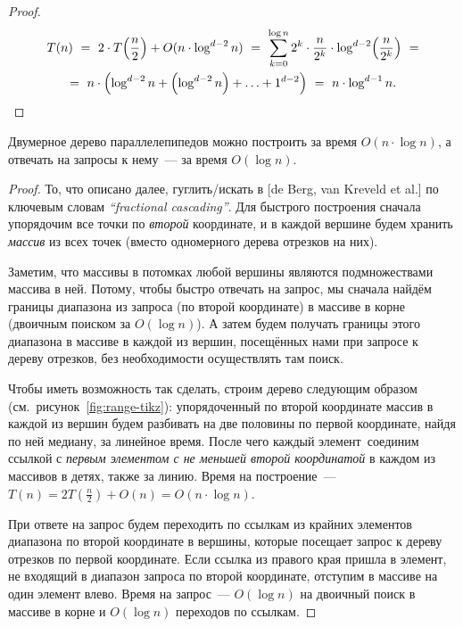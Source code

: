 \documentclass[a4paper,11pt]{article}
\begin{document}
\begin{proof}  \begin{multline*}
  T(n)\ =\ 2 \cdot T \lr*{\frac n 2} + O (n \cdot \log^{d-2} n)\ =\ 
  \sum_{k = 0}^{\log n} 2^k \cdot \frac{n}{2^k} \cdot
    \log^{d-2} \lr*{\frac{n}{2^k}}\ = \\
  =\ n \cdot \lr*{\log^{d-2} n + \lr*{\log^{d-2} n}
    + \ldots + 1^{d-2}}
  \ =\ n \cdot \log^{d-1} n.
\end{multline*}  \end{proof}

\begin{theorem}
  Двумерное дерево параллелепипедов можно построить за время
  \(O (n \cdot \log n)\), а отвечать на запросы к нему~—
  за время \(O (\log n)\).
\end{theorem}

\begin{proof}
  То, что описано далее, гуглить/искать в [de Berg, van Kreveld et al.]
  по ключевым словам \emph{``fractional cascading''}.
  Для быстрого построения сначала упорядочим все точки по
  \emph{второй} координате, и в каждой вершине будем хранить \emph{массив}
  из всех точек (вместо одномерного дерева отрезков на них).

  Заметим, что массивы в потомках любой вершины являются подмножествами
  массива в ней. Потому, чтобы быстро отвечать на запрос,
  мы сначала найдём границы диапазона из запроса
  (по второй координате) в массиве в корне (двоичным поиском
  за \(O (\log n)\)). А затем будем получать границы этого диапазона
  в массиве в каждой из вершин, посещённых нами при запросе к дереву
  отрезков, без необходимости осуществлять там поиск.

  Чтобы иметь возможность так сделать, строим дерево следующим образом
  (см.~рисунок~\ref{fig:range-tikz}): упорядоченный по второй координате массив
  в каждой из вершин будем разбивать на две половины по первой координате,
  найдя по ней медиану, за линейное время. После чего каждый элемент\
  соединим ссылкой с \emph{первым элементом с не меньшей второй координатой}
  в каждом из массивов в детях, также за линию. Время на построение~—
  \(T(n) = 2T(\frac n 2) + O(n) = O(n \cdot \log n)\).

  При ответе на запрос будем переходить по ссылкам из крайних элементов
  диапазона по второй координате в вершины, которые посещает запрос
  к дереву отрезков по первой координате. Если ссылка из правого края
  пришла в элемент, не входящий в диапазон запроса по второй координате,
  отступим в массиве на один элемент влево. Время на запрос~— \(O (\log n)\)
  на двоичный поиск в массиве в корне и \(O (\log n)\) переходов по ссылкам.
\end{proof}
\end{document}
